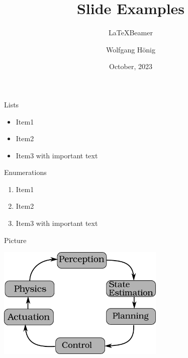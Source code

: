 \documentclass[aspectratio=169,xcolor={svgnames}]{beamer}
\title{Slide Examples}
\subtitle{\LaTeX Beamer}
\author{Wolfgang Hönig}
\date{October, 2023}
\begin{document}

  \begin{frame}{Lists}

    \begin{itemize}
      \item Item1
      \item Item2
      \item Item3 with \alert{important} text
    \end{itemize}

  \end{frame}

  \begin{frame}{Enumerations}

    \begin{enumerate}
      \item Item1
      \item Item2
      \item Item3 with \alert{important} text
    \end{enumerate}

  \end{frame}

  \begin{frame}{Picture}
    
    \centering
    \includegraphics[width=0.6\textwidth]{images/robotics.pdf}

  \end{frame}

  \appendix
\end{document}
